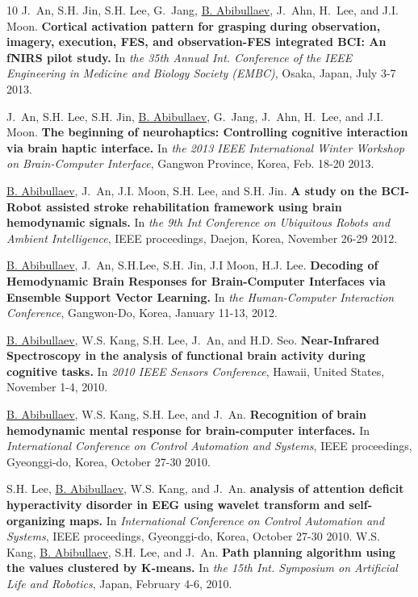 \documentclass[10pt,letterpaper,sans]{moderncv}   %
\begin{document}
\begin{thebibliography}{10}
	J.~An, S.H. Jin, S.H. Lee, G.~Jang, \underline{B. Abibullaev}, J.~Ahn, H.~Lee, and J.I. Moon.
	\newblock \textbf{Cortical activation pattern for grasping during observation, imagery, execution, {FES}, and observation-{FES} integrated {BCI}: An {fNIRS} pilot study.}
	\newblock In {\em the 35th Annual Int. Conference of the {IEEE} Engineering in Medicine and Biology Society (EMBC)}, Osaka, Japan, July 3-7 2013.
	
	J.~An, S.H. Lee, S.H. Jin, \underline{B. Abibullaev}, G.~Jang, J.~Ahn, H.~Lee,  and J.I. Moon.
	\newblock \textbf{The beginning of neurohaptics: Controlling cognitive interaction via brain haptic interface.}
	\newblock In {\em the 2013 IEEE International Winter Workshop on Brain-Computer Interface}, Gangwon Province, Korea, Feb. 18-20 2013.
	
	\underline{B. Abibullaev}, J.~An, J.I. Moon, S.H. Lee, and S.H. Jin.
	\newblock \textbf{A study on the {BCI}-{Robot} assisted stroke rehabilitation framework using brain hemodynamic signals.}
	\newblock In {\em the 9th Int Conference on Ubiquitous Robots and Ambient Intelligence}, IEEE proceedings, Daejon, Korea, November 26-29 2012.
	
	\underline{B. Abibullaev}, J.~An, S.H.Lee, S.H. Jin, J.I Moon, H.J. Lee.
	\newblock \textbf{Decoding of Hemodynamic Brain Responses for Brain-Computer Interfaces via Ensemble Support Vector Learning.}
	\newblock In {\em the Human-Computer Interaction Conference}, Gangwon-Do, Korea, January 11-13, 2012.
	
	\underline{B. Abibullaev}, W.S. Kang, S.H. Lee, J.~An, and H.D. Seo.
	\newblock \textbf{Near-Infrared Spectroscopy in the analysis of functional brain activity during cognitive tasks.}
	\newblock In {\em 2010 IEEE Sensors Conference}, Hawaii, United States, November 1-4, 2010.
	
	\underline{B. Abibullaev}, W.S. Kang, S.H. Lee, and J.~An.
	\newblock \textbf{Recognition of brain hemodynamic mental response for brain-computer interfaces.}
	\newblock In {\em International Conference on Control Automation and Systems}, IEEE proceedings,  Gyeonggi-do, Korea, October 27-30 2010.
	
	S.H. Lee, \underline{B. Abibullaev}, W.S. Kang, and J.~An.
	\newblock \textbf{analysis of attention deficit hyperactivity disorder in {EEG} using wavelet transform and self-organizing maps.}
	\newblock In {\em International Conference on Control Automation and Systems}, IEEE proceedings, Gyeonggi-do, Korea, October 27-30 2010.
	W.S. Kang, \underline{B. Abibullaev}, S.H. Lee, and J.~An.
	\newblock \textbf{Path planning algorithm using the values clustered by K-means.}
	\newblock In {\em the 15th Int. Symposium on Artificial Life and Robotics}, Japan, February 4-6, 2010.
	

\end{thebibliography}
\end{document}
